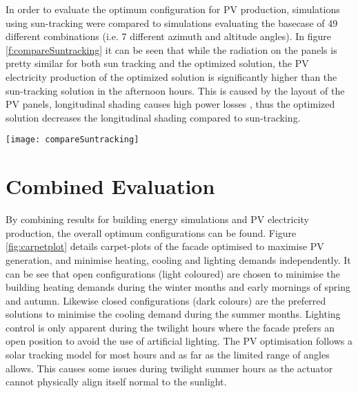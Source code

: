 		In order to evaluate the optimum configuration for PV production, simulations using sun-tracking were compared to simulations evaluating the basecase of 49 different combinations (i.e. 7 different azimuth and altitude angles). In figure \ref{f:compareSuntracking} it can be seen that while the radiation on the panels is pretty similar for both sun tracking and the optimized solution, the PV electricity production of the optimized solution is significantly higher than the sun-tracking solution in the afternoon hours. This is caused by the layout of the PV panels, longitudinal shading causes high power losses \cite{hofer2015PVSEC}, thus the optimized solution decreases the longitudinal shading compared to sun-tracking. 

		\begin{figure*}
			\begin{center}
			\texttt{[image: compareSuntracking]}
			\caption{Comparison of optimized solution to sun-tracking. a) average radiation on panels compared to radiation without shading b) PV electricity production comparison c) efficiency comparison}
			\label{f:compareSuntracking}
			\end{center}
		\end{figure*}




\section{Combined Evaluation}

	By combining results for building energy simulations and PV electricity production, the overall optimum configurations can be found. Figure \ref{fig:carpetplot} details carpet-plots of the facade optimised to maximise PV generation, and minimise heating, cooling and lighting demands independently. It can be see that open configurations (light coloured) are chosen to minimise the building heating demands during the winter months and early mornings of spring and autumn. Likewise closed configurations (dark colours) are the preferred solutions to minimise the cooling demand during the summer months. Lighting control is only apparent during the twilight hours where the facade prefers an open position to avoid the use of artificial lighting. The PV optimisation follows a solar tracking model for most hours and as far as the limited range of angles allows. This causes some issues during twilight summer hours as the actuator cannot physically align itself normal to the sunlight. 




